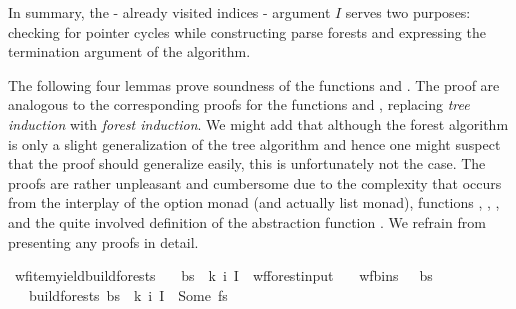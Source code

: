 \begin{isabellebody}
\begin{isamarkuptext}
In summary, the - already visited indices - argument $I$ serves two purposes: checking for pointer cycles while
constructing parse forests and expressing the termination argument of the algorithm.%
\end{isamarkuptext}\isamarkuptrue%
%
\isadelimdocument
%
\endisadelimdocument
%
\isatagdocument
%
\isamarkuptrue%
%
\endisatagdocument
{\isafolddocument}%
%
\isadelimdocument
%
\endisadelimdocument
%
\begin{isamarkuptext}%
The following four lemmas prove soundness of the functions  and .
The proof are analogous to the corresponding proofs for the functions  and ,
replacing \textit{tree induction} with \textit{forest induction}. We might add that although the forest algorithm
is only a slight generalization of the tree algorithm and hence one might suspect that the proof should generalize
easily, this is unfortunately not the case. The proofs are rather unpleasant and cumbersome due to the complexity
that occurs from the interplay of the option monad (and actually list monad), functions , ,
, and the quite involved definition of the abstraction function . We refrain from
presenting any proofs in detail.%
\end{isamarkuptext}\isamarkuptrue%
\isamarkupfalse%
\ wf{\isacharunderscore}{\kern0pt}item{\isacharunderscore}{\kern0pt}yield{\isacharunderscore}{\kern0pt}build{\isacharunderscore}{\kern0pt}forests{\isacharprime}{\kern0pt}{\isacharcolon}{\kern0pt}\isanewline
\ \ \ {\isachardoublequoteopen}{\isacharparenleft}{\kern0pt}bs{\isacharcomma}{\kern0pt}\ {\isasymomega}{\isacharcomma}{\kern0pt}\ k{\isacharcomma}{\kern0pt}\ i{\isacharcomma}{\kern0pt}\ I{\isacharparenright}{\kern0pt}\ {\isasymin}\ wf{\isacharunderscore}{\kern0pt}forest{\isacharunderscore}{\kern0pt}input{\isachardoublequoteclose}\isanewline
\ \ \ {\isachardoublequoteopen}wf{\isacharunderscore}{\kern0pt}bins\ {\isasymG}\ {\isasymomega}\ bs{\isachardoublequoteclose}\isanewline
\ \ \ {\isachardoublequoteopen}build{\isacharunderscore}{\kern0pt}forests{\isacharprime}{\kern0pt}\ bs\ {\isasymomega}\ k\ i\ I\ {\isacharequal}{\kern0pt}\ Some\ fs{\isachardoublequoteclose}\isanewline

\end{isabellebody}
